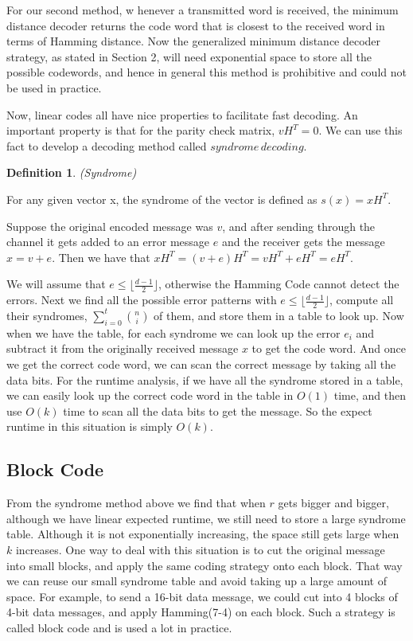 \documentclass{article}
\newtheorem{Definition}{Definition}
\begin{document}
For our second method, w henever a transmitted word is received, the minimum distance decoder returns the code word that is closest to the received word in terms of Hamming distance. Now the generalized minimum distance decoder strategy, as stated in Section 2, will need exponential space to store all the possible codewords, and hence in general this method is prohibitive and could not be used in practice.

Now, linear codes all have nice properties to facilitate fast decoding. An important property is that for the parity check matrix,  $vH^T = 0$. We can use this fact to develop a decoding method called $syndrome\, decoding$.\\
\begin{Definition}(Syndrome)\end{Definition}
\noindent For any given vector x, the syndrome of the vector is defined as $s(x) = xH^T$.

Suppose the original encoded message was $v$, and after sending through the channel it gets added to an error message $e$ and the receiver gets the message $x = v+e$. Then we have that $xH^T = (v+e)H^T = vH^T+eH^T = eH^T$. 

We will assume that $e \leq \lfloor \frac{d - 1}{2} \rfloor$, otherwise the Hamming Code cannot detect the errors. Next we find all the possible error patterns with $e \leq \lfloor \frac{d - 1}{2} \rfloor$, compute all their syndromes, $ \sum_{i=0}^{t}{n \choose i} $ of them, and store them in a table to look up. Now when we have the table, for each syndrome we can look up the error $e_i$ and subtract it from the originally received message $x$ to get the code word. And once we get the correct code word, we can scan the correct message by taking all the data bits. For the runtime analysis, if we have all the syndrome stored in a table, we can easily look up the correct code word in the table in $O(1)$ time, and then use $O(k)$ time to scan all the data bits to get the message. So the expect runtime in this situation is simply $O(k)$.\\
\subsection{Block Code}
From the syndrome method above we find that when $r$ gets bigger and bigger, although we have linear expected runtime, we still need to store a large syndrome table. Although it is not exponentially increasing, the space still gets large when $k$ increases. One way to deal with this situation is to cut the original message into small blocks, and apply the same coding strategy onto each block. That way we can reuse our small syndrome table and avoid taking up a large amount of space. For example, to send a 16-bit data message, we could cut into 4 blocks of 4-bit data messages, and apply  Hamming(7-4) on each block. Such a strategy is called block code and is used a lot in practice.
\end{document}

